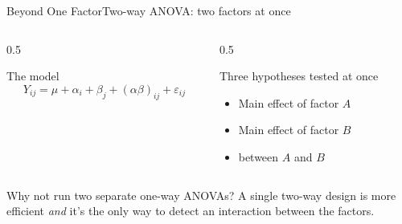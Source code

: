 \documentclass[aspectratio=169,11pt]{beamer}
\begin{document}
\begin{frame}{Beyond One Factor}{Two-way ANOVA: two factors at once}
  \begin{columns}[T]
    \begin{column}{0.5\textwidth}
      \begin{block}{The model}
        \[ Y_{ij} = \mu + \alpha_i + \beta_j + (\alpha\beta)_{ij} + \varepsilon_{ij} \]
      \end{block}
    \end{column}
    \begin{column}{0.5\textwidth}
      \begin{exampleblock}{Three hypotheses tested at once}
        \small
        \begin{itemize}
          \item Main effect of factor $A$
          \item Main effect of factor $B$
          \item {} between $A$ and $B$
        \end{itemize}
      \end{exampleblock}
    \end{column}
  \end{columns}
  \vfill
  \begin{alertblock}{Why not run two separate one-way ANOVAs?}
    \small A single two-way design is more efficient \emph{and} it's the
    only way to detect an interaction between the factors.
  \end{alertblock}
\end{frame}
\end{document}
